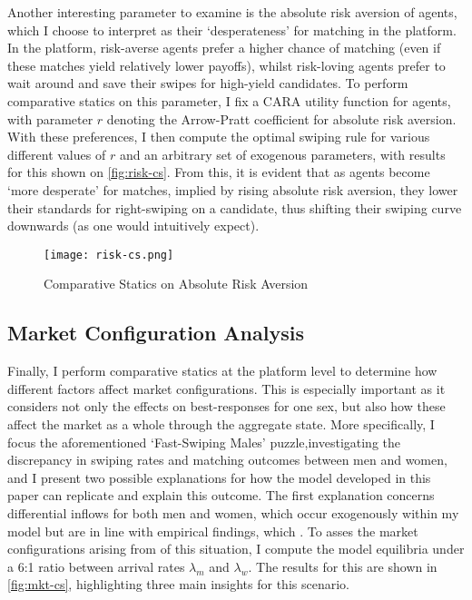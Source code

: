Another interesting parameter to examine is the absolute risk aversion of agents, which I choose to interpret as their `desperateness' for matching in the platform. In the platform, risk-averse agents prefer a higher chance of matching (even if these matches yield relatively lower payoffs), whilst risk-loving agents prefer to wait around and save their swipes for high-yield candidates. To perform comparative statics on this parameter, I fix a CARA utility function for agents, with parameter $r$ denoting the Arrow-Pratt coefficient for absolute risk aversion. With these preferences, I then compute the optimal swiping rule for various different values of $r$ and an arbitrary set of exogenous parameters, with results for this shown on \autoref{fig:risk-cs}. From this, it is evident that as agents become `more desperate' for matches, implied by rising absolute risk aversion, they lower their standards for right-swiping on a candidate, thus shifting their swiping curve downwards (as one would intuitively expect).

\begin{figure}[ht]
    \centering
    \caption{Comparative Statics on Absolute Risk Aversion}
    \texttt{[image: risk-cs.png]}
    \label{fig:risk-cs} 
\end{figure}

\subsection{Market Configuration Analysis}\label{sec:section3.3} 
Finally, I perform comparative statics at the platform level to determine how different factors affect market configurations. This is especially important as it considers not only the effects on best-responses for one sex, but also how these affect the market as a whole through the aggregate state. More specifically, I focus the aforementioned `Fast-Swiping Males' puzzle,investigating the discrepancy in swiping rates and matching outcomes between men and women, and I present two possible explanations for how the model developed in this paper can replicate and explain this outcome. The first explanation concerns differential inflows for both men and women, which occur exogenously within my model but are in line with empirical findings, which . To asses the market configurations arising from of this situation, I compute the model equilibria under a 6:1 ratio between arrival rates $\lambda_m$ and $\lambda_w$. The results for this are shown in \autoref{fig:mkt-cs}, highlighting three main insights for this scenario. 


